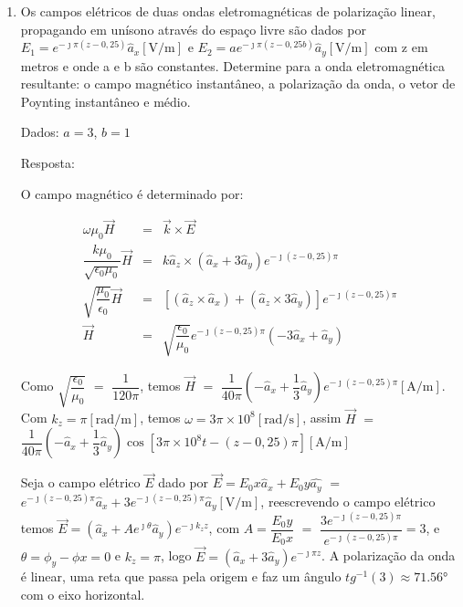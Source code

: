 \begin{enumerate}[1.]
\item Os campos elétricos de duas ondas eletromagnéticas de polarização linear, propagando em unísono através do espaço livre são dados por $E_{1} = e^{-\jmath \pi (z - 0,25)} \hat{a}_{x} [\si{\volt/\meter}]$ e $E_{2} = ae^{-\jmath \pi (z - 0,25b)} \hat{a}_{y} [\si{\volt/\meter}]$ com z em metros e onde a e b são constantes. Determine para a onda eletromagnética resultante: o campo magnético instantâneo, a polarização da onda, o vetor de Poynting instantâneo e médio.  
  

    Dados: $a = 3$, $b = 1$


    Resposta:

\vspace*{0.5cm}

O campo magnético é determinado por:

\begin{eqnarray*}
  \omega \mu_{0} \vec{H} & = &  \vec{k} \times \vec{E} \nonumber \\
  \dfrac{k \mu_{0}}{\sqrt{\epsilon_{0}\mu_{0}}} \vec{H} & = & k\hat{a}_{z} \times (\hat{a}_{x} + 3\hat{a}_{y})e^{-\jmath (z - 0,25)\pi} \nonumber \\
  \sqrt{\dfrac{\mu_{0}}{\epsilon_{0}}} \vec{H} & = & \left[ (\hat{a}_{z} \times \hat{a}_{x}) + (\hat{a}_{z} \times 3\hat{a}_{y}) \right]e^{-\jmath (z - 0,25)\pi} \nonumber \\
  \vec{H} & = & \sqrt{\dfrac{\epsilon_{0}}{\mu_{0}}}e^{-\jmath (z - 0,25)\pi}\left(-3\hat{a}_{x} + \hat{a}_{y}\right) \nonumber
\end{eqnarray*}

Como $\sqrt{\dfrac{\epsilon_{0}}{\mu_{0}}}$ $=$ $\dfrac{1}{120\pi}$, temos $\vec{H}$ $=$ $\dfrac{1}{40\pi}\left(-\hat{a}_{x} + \dfrac{1}{3}\hat{a}_{y}\right)e^{-\jmath (z - 0,25)\pi} [\si{\ampere/\meter}]$. Com $k_{z} = \pi [\si{\radian/\meter}]$, temos $\omega = 3\pi \times 10^{8} [\si{\radian/\second}]$, assim $\vec{H}$ $=$ $\dfrac{1}{40\pi}\left(-\hat{a}_{x} + \dfrac{1}{3}\hat{a}_{y}\right)\cos[3\pi \times 10^{8}t - (z - 0,25)\pi] [\si{\ampere/\meter}]$

Seja o campo elétrico $\vec{E}$ dado por $\vec{E} = E_{0}x \hat{a}_{x} + E_{0}y \hat{ a_{y}}$  $=$ $e^{-\jmath (z - 0,25) \pi} \hat{a}_{x} + 3 e^{-\jmath (z - 0,25)\pi} \hat{a}_{y} [\si{\volt/\meter}]$, reescrevendo o campo elétrico temos $\vec{E} = (\hat{a}_{x} + A e^{\jmath \theta} \hat{a}_{y})e^{-\jmath k_{z} z}$, com $A = \dfrac{E_{0}y}{E_{0}x}$ $=$ $\dfrac{3 e^{-\jmath (z - 0,25)\pi}}{e^{-\jmath (z - 0,25) \pi}} = 3$, e $\theta = \phi_{y} - \phi{x}  = 0$ e $k_{z} = \pi$, logo $\vec{E} = (\hat{a}_{x} + 3 \hat{a}_{y})e^{-\jmath \pi z}$. A polarização da onda é linear, uma reta que passa pela origem e faz um ângulo $tg^{-1}(3) \approx 71.56\si{\degree}$ com o eixo horizontal.


\end{enumerate}
